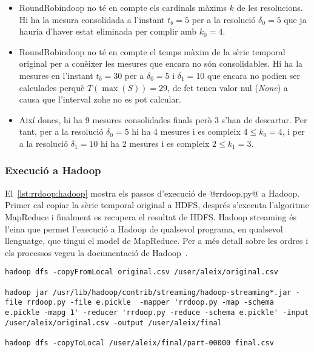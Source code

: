 \begin{itemize}
\item RoundRobindoop no té en compte els cardinals màxims $k$ de les resolucions. Hi ha la mesura consolidada a l'instant $t_b=5$ per a la resolució $\delta_0=5$ que ja hauria d'haver estat eliminada per complir amb $k_0=4$.

\item RoundRobindoop no té en compte el temps màxim de la sèrie
  temporal original per a conèixer les mesures que encara no són
  consolidables. Hi ha la mesures en l'instant $t_b=30$ per a
  $\delta_0=5$ i $\delta_1=10$ que encara no podien ser calculades
  perquè $T(\max(S))=29$, de fet tenen valor nul (\emph{None}) a causa
  que l'interval \gls{zohe} no es pot calcular.

\item Així doncs, hi ha 9 mesures consolidades finals però 3 s'han de
  descartar. Per tant, per a la resolució $\delta_0=5$ hi ha 4 mesures
  i es compleix $4 \leq k_0=4$, i per a la resolució $\delta_1=10$ hi ha 2
  mesures i es compleix $2 \leq k_1=3$.
\end{itemize}




\subsubsection{Execució a Hadoop}


El~\autoref{lst:rrdoop:hadoop} mostra els passos d'execució de
@rrdoop.py@ a Hadoop. Primer cal copiar la sèrie temporal original a
\gls{HDFS}, després s'executa l'algoritme MapReduce i finalment es
recupera el resultat de \gls{HDFS}.  Hadoop streaming és l'eina que
permet l'execució a Hadoop de qualsevol programa, en qualsevol
llenguatge, que tingui el model de MapReduce.
Per a més detall sobre les ordres
i els processos vegeu la documentació de Hadoop~\parencite{hadoop}.


\begin{lstlisting}[style=sh,caption=Execució a Hadoop de
  rrdoop.py,label=lst:rrdoop:hadoop]
hadoop dfs -copyFromLocal original.csv /user/aleix/original.csv

hadoop jar /usr/lib/hadoop/contrib/streaming/hadoop-streaming*.jar -file rrdoop.py -file e.pickle  -mapper 'rrdoop.py -map -schema e.pickle -mapg 1' -reducer 'rrdoop.py -reduce -schema e.pickle' -input /user/aleix/original.csv -output /user/aleix/final

hadoop dfs -copyToLocal /user/aleix/final/part-00000 final.csv
\end{lstlisting}

